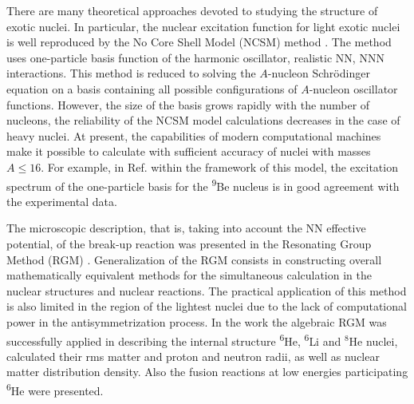 \documentclass[
12pt, %
oneside, %
english, %
onehalfspacing, %
onehalfspacing, %
headsepline, %
]{MastersDoctoralThesis} %
\newcommand{\he}{\textsuperscript{6}He\xspace}
\newcommand{\li}{\textsuperscript{6}Li\xspace}
\newcommand{\be}{\textsuperscript{9}Be\xspace}
\begin{document}
There are many theoretical approaches \cite{descouvemont200112be, tohsaki2001alpha, kanada1995structure, pudliner1997quantum, zhukov1993bound}  devoted to studying the structure of exotic nuclei. In particular, the nuclear excitation function for light exotic nuclei is well reproduced by the No Core Shell Model (NCSM) method \cite{navratil2009recent, forssen2005large, navratil2003ab, navratil2002ab}. 
The method uses one-particle basis function of the harmonic oscillator,  realistic NN, NNN interactions. 
This method is reduced to solving the $A$-nucleon Schr\"{o}dinger equation on a basis containing all possible configurations of $A$-nucleon oscillator functions. 
However, the size of the basis grows rapidly with the number of nucleons, the reliability of the NCSM model calculations decreases in the case of heavy nuclei. At present, the capabilities of modern computational machines make it possible to calculate with sufficient accuracy of nuclei with masses $A \le 16$.
For example, in Ref. \cite{forssen2005large} within the framework of this model, the excitation spectrum of the one-particle basis for the \be nucleus is in good agreement with the experimental data. 

The microscopic description, that is, taking into account the NN effective potential, of the break-up reaction was presented in the Resonating Group Method (RGM) \cite{horiuchi1970generator, tang1978resonating, wheeler1937mathematical}. Generalization of the RGM consists in constructing overall mathematically equivalent methods for the simultaneous calculation in the nuclear structures and nuclear reactions. 
The practical application of this method is also limited in the region of the lightest nuclei due to the lack of computational power in the antisymmetrization process.
In the work \cite{nesterov2010three} the algebraic RGM was successfully applied in describing the internal structure \he, \li and $^8$He nuclei, calculated their rms matter and proton
and neutron radii, as well as nuclear matter distribution density. Also the fusion reactions at low energies participating \he were presented.
\end{document}
